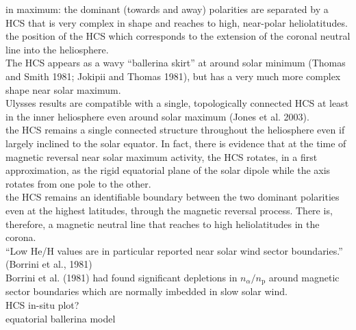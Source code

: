 in maximum: the dominant (towards and away) polarities are separated by a HCS that is very complex in shape and reaches to high, near-polar heliolatitudes.\\
the position of the HCS which corresponds to the extension of the coronal neutral line into the heliosphere.\\
The HCS appears as a wavy “ballerina skirt” at around solar minimum (Thomas and Smith 1981; Jokipii and Thomas 1981), but has a very much more complex shape near solar maximum.\\
Ulysses results are compatible with a single, topologically connected HCS at least in the inner heliosphere even around solar maximum (Jones et al. 2003).\\
the HCS remains a single connected structure throughout the heliosphere even if largely inclined to the solar equator. In fact, there is evidence that at the time of magnetic reversal near solar maximum activity, the HCS rotates, in a first approximation, as the rigid equatorial plane of the solar dipole while the axis rotates from one pole to the other.\\
the HCS remains an identifiable boundary between the two dominant polarities even at the highest latitudes, through the magnetic reversal process. There is, therefore, a magnetic neutral line that reaches to high heliolatitudes in the corona.\\


``Low He/H values are in particular reported near solar wind sector boundaries.'' (Borrini et al., 1981)\\
Borrini et al. (1981) had found significant depletions in $n_\alpha/n_\text{p}$ around magnetic sector boundaries which are normally imbedded in slow solar wind.\\

HCS in-situ plot?\\

equatorial ballerina model\\


